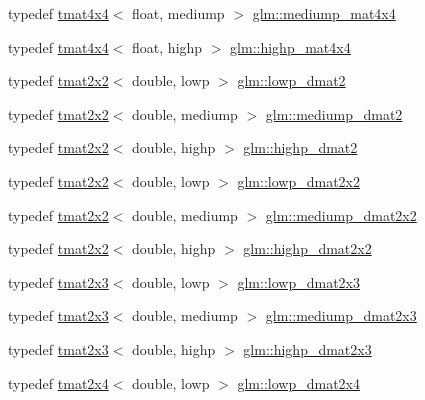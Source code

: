\begin{DoxyCompactItemize}
\item 
typedef \hyperlink{structglm_1_1tmat4x4}{tmat4x4}$<$ float, mediump $>$ \hyperlink{group__core__precision_gaad45864262bb2cf923667fde779a0058}{glm\+::mediump\+\_\+mat4x4}
\item 
typedef \hyperlink{structglm_1_1tmat4x4}{tmat4x4}$<$ float, highp $>$ \hyperlink{group__core__precision_gaccec2a0346f946bcbd656386a9ab87d7}{glm\+::highp\+\_\+mat4x4}
\item 
typedef \hyperlink{structglm_1_1tmat2x2}{tmat2x2}$<$ double, lowp $>$ \hyperlink{group__core__precision_ga42a83e53bbcc740b6ae501fec19dda69}{glm\+::lowp\+\_\+dmat2}
\item 
typedef \hyperlink{structglm_1_1tmat2x2}{tmat2x2}$<$ double, mediump $>$ \hyperlink{group__core__precision_ga15d28c9d2c24b698597e9ad9e083520d}{glm\+::mediump\+\_\+dmat2}
\item 
typedef \hyperlink{structglm_1_1tmat2x2}{tmat2x2}$<$ double, highp $>$ \hyperlink{group__core__precision_ga08cc902dad76205cd28a80bf695814a7}{glm\+::highp\+\_\+dmat2}
\item 
typedef \hyperlink{structglm_1_1tmat2x2}{tmat2x2}$<$ double, lowp $>$ \hyperlink{group__core__precision_ga62d3af99b9e0659d693c80b75df9a35c}{glm\+::lowp\+\_\+dmat2x2}
\item 
typedef \hyperlink{structglm_1_1tmat2x2}{tmat2x2}$<$ double, mediump $>$ \hyperlink{group__core__precision_ga949bee59342f1c3258522bacd07ffe95}{glm\+::mediump\+\_\+dmat2x2}
\item 
typedef \hyperlink{structglm_1_1tmat2x2}{tmat2x2}$<$ double, highp $>$ \hyperlink{group__core__precision_gaf0445ee32625d26bf79bb84e3d5a5502}{glm\+::highp\+\_\+dmat2x2}
\item 
typedef \hyperlink{structglm_1_1tmat2x3}{tmat2x3}$<$ double, lowp $>$ \hyperlink{group__core__precision_gada78eb998a9c716aedee01501456b94d}{glm\+::lowp\+\_\+dmat2x3}
\item 
typedef \hyperlink{structglm_1_1tmat2x3}{tmat2x3}$<$ double, mediump $>$ \hyperlink{group__core__precision_ga0b187380697f66a25000b307db9cb41a}{glm\+::mediump\+\_\+dmat2x3}
\item 
typedef \hyperlink{structglm_1_1tmat2x3}{tmat2x3}$<$ double, highp $>$ \hyperlink{group__core__precision_ga29884defff6f7109b1e99ef8a6ce7e0a}{glm\+::highp\+\_\+dmat2x3}
\item 
typedef \hyperlink{structglm_1_1tmat2x4}{tmat2x4}$<$ double, lowp $>$ \hyperlink{group__core__precision_ga2aee5f52e32f0adcfdeb3142b50cb660}{glm\+::lowp\+\_\+dmat2x4}
\item 

\end{DoxyCompactItemize}
